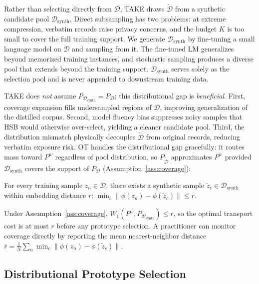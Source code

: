 \begin{foldable} %
  Rather than selecting directly from $\mathcal{D}$, TAKE draws $\tilde{\mathcal{D}}$ from a synthetic candidate pool $\mathcal{D}_\text{synth}$.
  Direct subsampling has two problems: at extreme compression, verbatim records raise privacy concerns, and the budget $K$ is too small to cover the full training support.
  We generate $\mathcal{D}_\text{synth}$ by fine-tuning a small language model on $\mathcal{D}$ and sampling from it.
  The fine-tuned LM generalizes beyond memorized training instances, and stochastic sampling produces a diverse pool that extends beyond the training support.
  $\mathcal{D}_\text{synth}$ serves solely as the selection pool and is never appended to downstream training data.
\end{foldable}

\begin{foldable} %
  TAKE does \textit{not} assume $P_{\mathcal{D}_\text{synth}} = P_{\mathcal{D}}$; this distributional gap is \textit{beneficial}.
  First, coverage expansion fills undersampled regions of $\mathcal{D}$, improving generalization of the distilled corpus.
  Second, model fluency bias suppresses noisy samples that \ac{HSB} would otherwise over-select, yielding a cleaner candidate pool.
  Third, the distribution mismatch physically decouples $\tilde{\mathcal{D}}$ from original records, reducing verbatim exposure risk.
  \Acl{OT} handles the distributional gap gracefully: it routes mass toward $P^w$ regardless of pool distribution, so $P_{\tilde{\mathcal{D}}}$ approximates $P^w$ provided $\mathcal{D}_\text{synth}$ covers the support of $P_{\mathcal{D}}$ (Assumption~\ref{ass:coverage}):
  \begin{assumption} \label{ass:coverage}
    For every training sample $z_n \in \mathcal{D}$, there exists a synthetic sample $\tilde{z}_c \in \mathcal{D}_\text{synth}$ within embedding distance $r$:
    $\min_c \|\phi(z_n) - \phi(\tilde{z}_c)\| \leq r$.
  \end{assumption}
  Under Assumption~\ref{ass:coverage}, $W_1(P^w, P_{\mathcal{D}_\text{synth}}) \leq r$, so the optimal transport cost is at most $r$ before any prototype selection.
  A practitioner can monitor coverage directly by reporting the mean nearest-neighbor distance $\bar{r} = \frac{1}{N}\sum_n \min_c \|\phi(z_n) - \phi(\tilde{z}_c)\|$.
\end{foldable}

\subsection{Distributional Prototype Selection} \label{sec:53-research03-method-ot}

